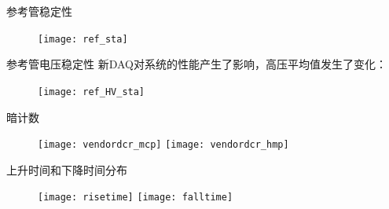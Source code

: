 \begin{frame}{参考管稳定性}
\begin{figure}
\centering
\texttt{[image: ref\_sta]}
\end{figure}
\end{frame}
\begin{frame}{参考管电压稳定性}
新DAQ对系统的性能产生了影响，高压平均值发生了变化：
\begin{figure}
\centering
\texttt{[image: ref\_HV\_sta]}
\end{figure}
\end{frame}
\begin{frame}{暗计数}
\begin{figure}
\centering
\texttt{[image: vendordcr\_mcp]}
\texttt{[image: vendordcr\_hmp]}
\end{figure}
\end{frame}
\begin{frame}{上升时间和下降时间分布}
\begin{figure}
\centering
\texttt{[image: risetime]}
\texttt{[image: falltime]}
\end{figure}
\end{frame}
